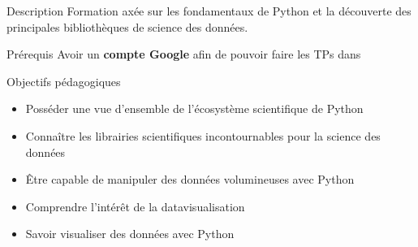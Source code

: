 \begin{frame}{Description}
  Formation axée sur les fondamentaux de Python et la découverte des principales bibliothèques de science des données.
\end{frame}

\begin{frame}{Prérequis}
  Avoir un \textbf{compte Google} afin de pouvoir faire les TPs dans 
\end{frame}

\begin{frame}{Objectifs pédagogiques}

\begin{itemize}
  \item Posséder une vue d’ensemble de l’écosystème scientifique de Python
  \item Connaître les librairies scientifiques incontournables pour la science des données
  \item Être capable de manipuler des données volumineuses avec Python
  \item Comprendre l’intérêt de la datavisualisation
  \item Savoir visualiser des données avec Python
\end{itemize}

\end{frame}
